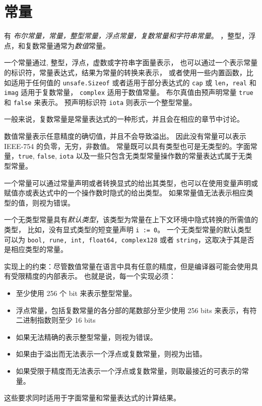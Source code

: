 
\chapter{常量}
有 \emph{布尔常量，\rune{}常量，整型常量，浮点常量，复数常量和字符串常量}。
\rune{}，整型，浮点，和复数常量通常为\emph{数值}常量。

一个常量通过\rune{}, 整型，浮点，虚数或字符串字面量表示，
也可以通过一个表示常量的标识符，常量表达式，结果为常量的转换来表示，
或者使用一些内置函数，比如适用于任何值的 \lstinline|unsafe.Sizeof| 或者适用于部分表达式的 \lstinline|cap| 或 \lstinline|len|，\lstinline|real| 和 \lstinline|imag| 适用于复数常量，
\lstinline|complex| 适用于数值常量。
布尔真值由预声明常量 \lstinline|true| 和 \lstinline|false| 来表示。
预声明标识符 \lstinline|iota| 则表示一个整型常量。

一般来说，复数常量是常量表达式的一种形式，并且会在相应的章节中讨论。

数值常量表示任意精度的确切值，并且不会导致溢出。
因此没有常量可以表示 IEEE-754 的负零，无穷，非数值。
常量既可以具有类型也可是无类型的。字面常量，\lstinline|true|, \lstinline|false|, \lstinline|iota| 以及一些只包含无类型常量操作数的常量表达式属于无类型常量。

一个常量可以通过常量声明或者转换显式的给出其类型，也可以在使用变量声明或赋值亦或表达式中的一个操作数时隐式的给出类型。
如果常量值无法表示相应类型的值，则视为错误。

一个无类型常量具有\emph{默认类型}，该类型为常量在上下文环境中隐式转换的所需值的类型，
比如，没有显式类型的短变量声明 \lstinline|i := 0|。
一个无类型常量的默认类型可以为 \lstinline|bool, rune, int, float64, complex128| 或者 \lstinline|string|，这取决于其是否是相应类型的常量。

实现上的约束：尽管数值常量在语言中具有任意的精度，但是编译器可能会使用具有受限精度的内部表示。
也就是说，每一个实现必须：
\begin{itemize}
\item 至少使用 256 个 bit 来表示整型常量。
\item 浮点常量，包括复数常量的各分部的尾数部分至少使用 256 bits 来表示，有符二进制指数则至少 16 bits
\item 如果无法精确的表示整型常量，则视为错误。
\item 如果由于溢出而无法表示一个浮点或复数常量，则视为出错。
\item 如果受限于精度而无法表示一个浮点或复数常量，则取最接近的可表示的常量。
\end{itemize}
这些要求同时适用于字面常量和常量表达式的计算结果。